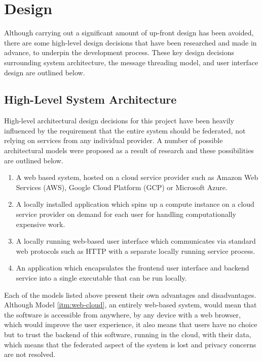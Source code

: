 \chapter{Design}

Although carrying out a significant amount of up-front design has been avoided, there are some high-level design decisions that have been researched and made in advance, to underpin the development process. These key design decisions surrounding system architecture, the message threading model, and user interface design are outlined below.

\section{High-Level System Architecture}\label{sec:high-level-architecture}

High-level architectural design decisions for this project have been heavily influenced by the requirement that the entire system should be federated, not relying on services from any individual provider. A number of possible architectural models were proposed as a result of research and these possibilities are outlined below.

\begin{enumerate}
  \item \label{itm:web-cloud} A web based system, hosted on a cloud service provider such as Amazon Web Services (AWS), Google Cloud Platform (GCP) or Microsoft Azure.
  \item \label{itm:on-demand-cloud} A locally installed application which spins up a compute instance on a cloud service provider on demand for each user for handling computationally expensive work.
  \item \label{itm:local-service} A locally running web-based user interface which communicates via standard web protocols such as HTTP with a separate locally running service process.
  \item \label{itm:electron} An application which encapsulates the frontend user interface and backend service into a single executable that can be run locally.
\end{enumerate}

Each of the models listed above present their own advantages and disadvantages. Although Model \ref{itm:web-cloud}, an entirely web-based system, would mean that the software is accessible from anywhere, by any device with a web browser, which would improve the user experience, it also means that users have no choice but to trust the backend of this software, running in the cloud, with their data, which means that the federated aspect of the system is lost and privacy concerns are not resolved.


